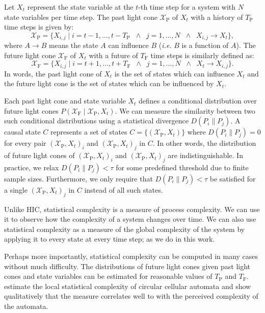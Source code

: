 Let $X_t$ represent the state variable at the $t$-th time step for a system
with $N$ state variables per time step. The past light cone
$\mathcal{X}_{\textrm{P}}$ of $X_t$ with a history of $T_{\textrm{P}}$ time
steps is given by:
\begin{equation}
    \mathcal{X}_{\textrm{P}} =
        \{X_{i, j} \mid i = t - 1, \ldots, t - T_{\textrm{P}}
            \;\;\land\;\; j = 1, \ldots, N
            \;\;\land\;\; X_{i, j} \rightarrow X_t \},
\end{equation}
where $A \rightarrow B$ means the state $A$ can influence $B$ (\emph{i.e.} $B$
is a function of $A$). The future light cone $\mathcal{X}_{\textrm{F}}$ of
$X_t$ with a future of $T_{\textrm{F}}$ time steps is similarly defined as:
\begin{equation}
    \mathcal{X}_{\textrm{F}} =
        \{X_{i, j} \mid i = t + 1, \ldots, t + T_{\textrm{F}}
            \;\;\land\;\; j = 1, \ldots, N
            \;\;\land\;\; X_t \rightarrow X_{i, j} \}.
\end{equation}
In words, the past light cone of $X_t$ is the set of states which can influence
$X_t$ and the future light cone is the set of states which can be influenced by
$X_t$.

Each past light cone and state variable $X_t$ defines a conditional
distribution over future light cones $P(\mathcal{X}_{\textrm{F}} \mid
\mathcal{X}_{\textrm{P}}, X_t)$. We can measure the similarity between two such
conditional distributions using a statistical divergence $D(P_i \| P_j)$. A
causal state $C$ represents a set of states $C = \{(\mathcal{X}_{\textrm{P}},
X_t)\}$ where $D(P_i \| P_j) = 0$ for every pair $(\mathcal{X}_{\textrm{P}},
X_t)_i$ and $(\mathcal{X}_{\textrm{P}}, X_t)_j$ in $C$. In other words, the
distribution of future light cones of $(\mathcal{X}_{\textrm{P}}, X_t)_i$ and
$(\mathcal{X}_{\textrm{P}}, X_t)_j$ are indistinguishable. In practice, we
relax $D(P_i \| P_j) < \tau$ for some predefined threshold due to finite
sample sizes. Furthermore, we only require that $D(P_i \| P_j) < \tau$ be
satisfied for a single $(\mathcal{X}_{\textrm{P}}, X_t)_j$ in $C$ instead of
all such states.

Unlike HIC, statistical complexity is a measure of process complexity. We can
use it to observe how the complexity of a system changes over time. We can also
use statistical complexity as a measure of the global complexity of the system
by applying it to every state at every time step; as we do in this work.

Perhaps more importantly, statistical complexity can be computed in many
cases without much difficulty. The distributions of future light cones given
past light cones and state variables can be estimated for reasonable values of
$T_\textrm{P}$ and $T_\textrm{F}$. \citet{shalizi2004quantifying} estimate the
local statistical complexity of circular cellular automata and show
qualitatively that the measure correlates well to with the perceived complexity
of the automata.
